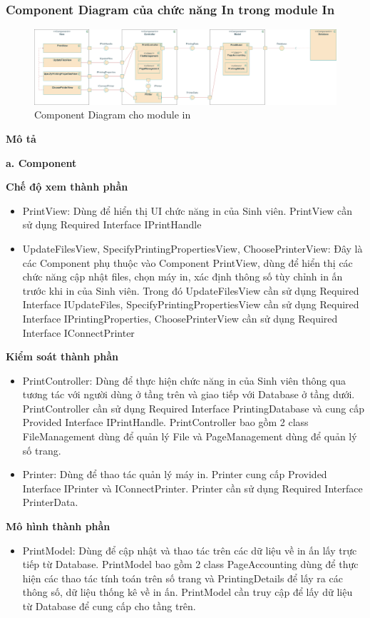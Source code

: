 \documentclass[a4paper]{article}
\begin{document}
\subsubsection{Component Diagram của chức năng In trong module In}
\begin{figure}[h!]
\begin{center}
\includegraphics[width=16cm]{picture/3.2.Component_Print.drawio.png}
\caption{Component Diagram cho module in}
\end{center}
\end{figure}
\noindent \textbf{Mô tả}

\noindent \textbf{a. Component}

\noindent \textbf{Chế độ xem thành phần}
\begin{itemize}
    \item PrintView: Dùng để hiển thị UI chức năng in của Sinh viên. PrintView cần sử dụng Required Interface IPrintHandle
    \item UpdateFilesView, SpecifyPrintingPropertiesView, ChoosePrinterView: Đây là các Component phụ thuộc vào Component PrintView, dùng để hiển thị các chức năng cập nhật files, chọn máy in, xác định thông số tùy chỉnh in ấn trước khi in của Sinh viên. Trong đó UpdateFilesView cần sử dụng Required Interface IUpdateFiles, SpecifyPrintingPropertiesView cần sử dụng Required Interface IPrintingProperties, ChoosePrinterView cần sử dụng Required Interface IConnectPrinter
\end{itemize}

\noindent \textbf{Kiểm soát thành phần}
\begin{itemize}
    \item PrintController: Dùng để thực hiện chức năng in của Sinh viên thông qua tương tác với người dùng ở tầng trên và giao tiếp với Database ở tầng dưới. PrintController cần sử dụng Required Interface PrintingDatabase và cung cấp Provided Interface IPrintHandle. PrintController bao gồm 2 class FileManagement dùng để quản lý File và PageManagement dùng để quản lý số trang.
    \item Printer: Dùng để thao tác quản lý máy in. Printer  cung cấp Provided Interface IPrinter  và IConnectPrinter. Printer cần sử dụng Required Interface PrinterData.
\end{itemize}
\noindent \textbf{Mô hình thành phần}
\begin{itemize}
    \item PrintModel: Dùng để cập nhật và thao tác trên các dữ liệu về in ấn lấy trực tiếp từ Database. PrintModel bao gồm 2 class PageAccounting dùng để thực hiện các thao tác tính toán trên số trang và PrintingDetails để lấy ra các thông số, dữ liệu thống kê về in ấn. PrintModel cần truy cập để lấy dữ liệu từ Database để cung cấp cho tầng trên.
\end{itemize}
\end{document}

